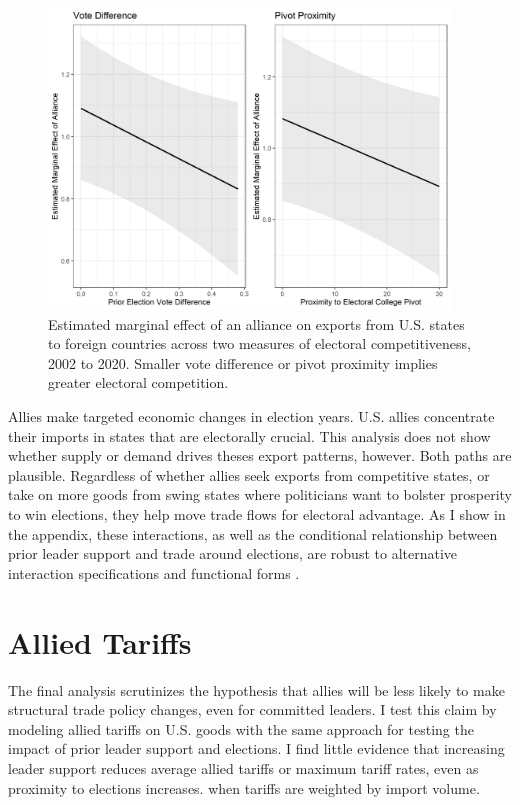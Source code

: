 \documentclass[12pt]{article}
\begin{document}
\begin{figure}[htpb]
	\centering
		\includegraphics[width=0.95\textwidth]{../figures/me-all-state.png}
	\caption{Estimated marginal effect of an alliance on exports from U.S. states to foreign countries across two measures of electoral competitiveness, 2002 to 2020. Smaller vote difference or pivot proximity implies greater electoral competition.}
	\label{fig:me-all-state}
\end{figure}


Allies make targeted economic changes in election years. 
U.S. allies concentrate their imports in states that are electorally crucial.
This analysis does not show whether supply or demand drives theses export patterns, however. 
Both paths are plausible. 
Regardless of whether allies seek exports from competitive states, or take on more goods from swing states where politicians want to bolster prosperity to win elections, they help move trade flows for electoral advantage. 
As I show in the appendix, these interactions, as well as the conditional relationship between prior leader support and trade around elections, are robust to alternative interaction specifications and functional forms \citep{Hainmuelleretal2019}.



\section{Allied Tariffs} 


The final analysis scrutinizes the hypothesis that allies will be less likely to make structural trade policy changes, even for committed leaders. 
I test this claim by modeling allied tariffs on U.S. goods with the same approach for testing the impact of prior leader support and elections. 
I find little evidence that increasing leader support reduces average allied tariffs or maximum tariff rates, even as proximity to elections increases. when tariffs are weighted by import volume. 
\end{document}
